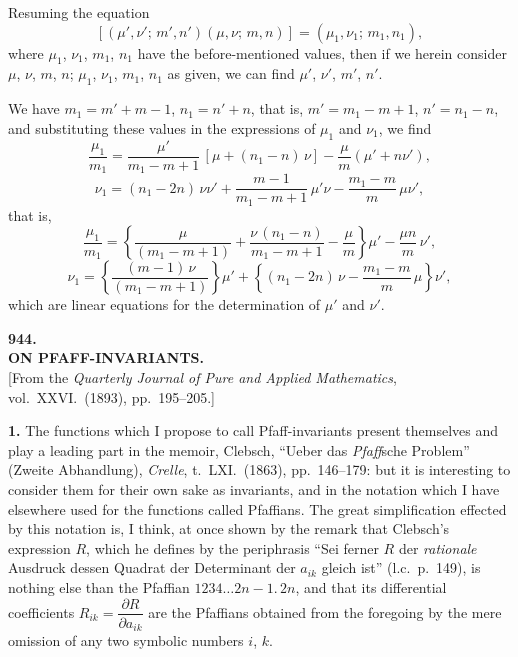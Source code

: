 \documentclass[11pt]{article}
\begin{document}
\bigskip

Resuming the equation
\[ [(\mu',\nu';\,m',n')(\mu,\nu;\,m,n)] = (\mu_{1},\nu_{1};\,m_{1},n_{1}), \]
where $\mu_{1}$, $\nu_{1}$, $m_{1}$, $n_{1}$ have the before-mentioned values, then if we herein consider $\mu$, $\nu$, $m$, $n$; $\mu_{1}$, $\nu_{1}$, $m_{1}$, $n_{1}$ as given, we can find $\mu'$, $\nu'$, $m'$, $n'$.

We have $m_{1} = m'+m-1$, $n_{1} = n'+n$, that is, $m' = m_{1}-m+1$, $n' = n_{1}-n$, and substituting these values in the expressions of $\mu_{1}$ and $\nu_{1}$, we find
\[
\frac{\mu_{1}}{m_{1}} = \frac{\mu'}{m_{1}-m+1}\,[\mu + (n_{1}-n)\,\nu] - \frac{\mu}{m}(\mu'+n\nu'),
\]
\[
\nu_{1} = (n_{1}-2n)\,\nu\nu' + \frac{m-1}{m_{1}-m+1}\,\mu'\nu - \frac{m_{1}-m}{m}\,\mu\nu',
\]
that is,
\[
\frac{\mu_{1}}{m_{1}} = \left\{\frac{\mu}{(m_{1}-m+1)} + \frac{\nu\,(n_{1}-n)}{m_{1}-m+1} - \frac{\mu}{m}\right\}\mu' - \frac{\mu n}{m}\,\nu',
\]
\[
\nu_{1} = \left\{\frac{(m-1)\,\nu}{(m_{1}-m+1)}\right\}\mu' + \left\{(n_{1}-2n)\,\nu - \frac{m_{1}-m}{m}\,\mu\right\}\nu',
\]
which are linear equations for the determination of $\mu'$ and $\nu'$.

\bigskip

\begin{center}
\textbf{\large 944.}\\[4pt]
\textbf{ON PFAFF-INVARIANTS.}\\[6pt]
[From the \textit{Quarterly Journal of Pure and Applied Mathematics}, vol.\ XXVI.\ (1893), pp.\ 195--205.]
\end{center}

\medskip
\textbf{1.} The functions which I propose to call Pfaff-invariants present themselves and play a leading part in the memoir, Clebsch, ``Ueber das \textit{Pfaff}sche Problem'' (Zweite Abhandlung), \textit{Crelle}, t.\ LXI.\ (1863), pp.\ 146--179: but it is interesting to consider them for their own sake as invariants, and in the notation which I have elsewhere used for the functions called Pfaffians. The great simplification effected by this notation is, I think, at once shown by the remark that Clebsch's expression $R$, which he defines by the periphrasis ``Sei ferner $R$ der \textit{rationale} Ausdruck dessen Quadrat der Determinant der $a_{ik}$ gleich ist'' (l.c.\ p.\ 149), is nothing else than the Pfaffian $1234\ldots 2n-1.\,2n$, and that its differential coefficients $R_{ik}=\dfrac{\partial R}{\partial a_{ik}}$ are the Pfaffians obtained from the foregoing by the mere omission of any two symbolic numbers $i$, $k$.
\end{document}
